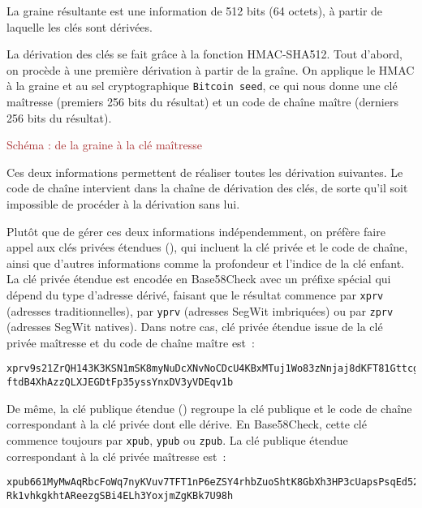 La graine résultante est une information de 512 bits (64 octets), à partir de laquelle les clés sont dérivées.


La dérivation des clés se fait grâce à la fonction HMAC-SHA512. Tout d'abord, on procède à une première dérivation à partir de la graîne. On applique le HMAC à la graine et au sel cryptographique \verb?Bitcoin seed?, ce qui nous donne une clé maîtresse (premiers 256 bits du résultat) et un code de chaîne maître (derniers 256 bits du résultat). 

\textcolor{brown}{Schéma : de la graine à la clé maîtresse}


Ces deux informations permettent de réaliser toutes les dérivation suivantes. Le code de chaîne intervient dans la chaîne de dérivation des clés, de sorte qu'il soit impossible de procéder à la dérivation sans lui.

Plutôt que de gérer ces deux informations indépendemment, on préfère faire appel aux clés privées étendues (), qui incluent la clé privée et le code de chaîne, ainsi que d'autres informations comme la profondeur et l'indice de la clé enfant. La clé privée étendue est encodée en Base58Check avec un préfixe spécial qui dépend du type d'adresse dérivé, faisant que le résultat commence par \verb?xprv? (adresses traditionnelles), par \verb?yprv? (adresses SegWit imbriquées) ou par \verb?zprv? (adresses SegWit natives). Dans notre cas, clé privée étendue issue de la clé privée maîtresse et du code de chaîne maître est~:

\begin{Verbatim}[fontsize=\footnotesize]
xprv9s21ZrQH143K3KSN1mSK8myNuDcXNvNoCDcU4KBxMTuj1Wo83zNnjaj8dKFT81GttcgP
ftdB4XhAzzQLXJEGDtFp35yssYnxDV3yVDEqv1b
\end{Verbatim}

De même, la clé publique étendue () regroupe la clé publique et le code de chaîne correspondant à la clé privée dont elle dérive. En Base58Check, cette clé commence toujours par \verb?xpub?, \verb?ypub? ou \verb?zpub?. La clé publique étendue correspondant à la clé privée maîtresse est~:  

\begin{Verbatim}[fontsize=\footnotesize]
xpub661MyMwAqRbcFoWq7nyKVuv7TFT1nP6eZSY4rhbZuoShtK8GbXh3HP3cUapsPsqEd52T
Rk1vhkgkhtAReezgSBi4ELh3YoxjmZgKBk7U98h
\end{Verbatim}

